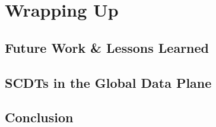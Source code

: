 \chapter{Wrapping Up}

\section{Future Work \& Lessons Learned}


\section{SCDTs in the Global Data Plane}



\section{Conclusion}


